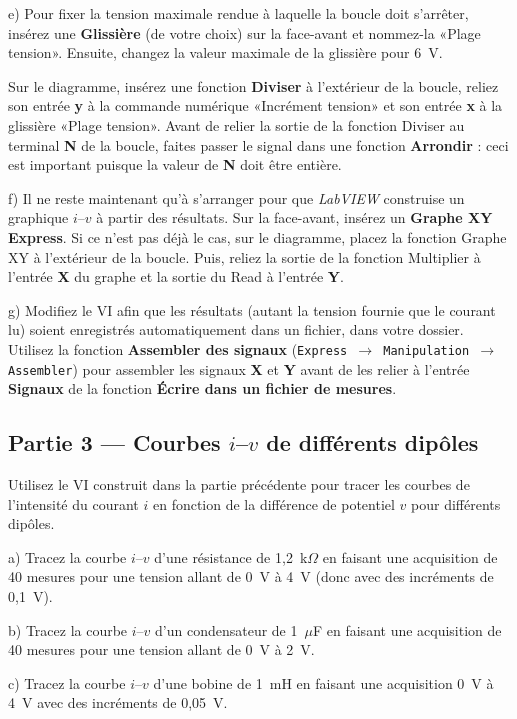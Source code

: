 \documentclass[canadien,12pt,oneside,letterpaper]{article}
\begin{document}
e) Pour fixer la tension maximale rendue à laquelle la boucle doit s'arrêter, insérez une \textbf{Glissière} (de votre choix) sur la face-avant et nommez-la «Plage tension». Ensuite, changez la valeur maximale de la glissière pour 6~V.

Sur le diagramme, insérez une fonction \textbf{Diviser} à l'extérieur de la boucle, reliez son entrée \textbf{y} à la commande numérique «Incrément tension» et son entrée \textbf{x} à la glissière «Plage tension». Avant de relier la sortie de la fonction Diviser au terminal \textbf{N} de la boucle, faites passer le signal dans une fonction \textbf{Arrondir} : ceci est important puisque la valeur de \textbf{N} doit être entière.

f) Il ne reste maintenant qu'à s'arranger pour que \textit{LabVIEW} construise un graphique $i$--$v$ à partir des résultats. Sur la face-avant, insérez un \textbf{Graphe XY Express}. Si ce n'est pas déjà le cas, sur le diagramme, placez la fonction Graphe XY à l'extérieur de la boucle. Puis, reliez la sortie de la fonction Multiplier à l'entrée \textbf{X} du graphe et la sortie du Read à l'entrée \textbf{Y}.

g) Modifiez le VI afin que les résultats (autant la tension fournie que le courant lu) soient enregistrés automatiquement dans un fichier, dans votre dossier. Utilisez la fonction \textbf{Assembler des signaux} (\texttt{Express $\rightarrow$ Manipulation $\rightarrow$ Assembler}) pour assembler les signaux \textbf{X} et \textbf{Y} avant de les relier à l'entrée \textbf{Signaux} de la fonction \textbf{Écrire dans un fichier de mesures}.


\subsection{Partie 3 --- Courbes $i$--$v$ de différents dipôles}

Utilisez le VI construit dans la partie précédente pour tracer les courbes de l'intensité du courant $i$ en fonction de la différence de potentiel $v$ pour différents dipôles.

a) Tracez la courbe $i$--$v$ d'une résistance de 1,2~k$\Omega$ en faisant une acquisition de 40 mesures pour une tension allant de 0~V à 4~V (donc avec des incréments de 0,1~V).

b) Tracez la courbe $i$--$v$ d'un condensateur de 1~$\mu$F en faisant une acquisition de 40 mesures pour une tension allant de 0~V à 2~V.

c) Tracez la courbe $i$--$v$ d'une bobine de 1~mH en faisant une acquisition 0~V à 4~V avec des incréments de 0,05~V.
\end{document}
